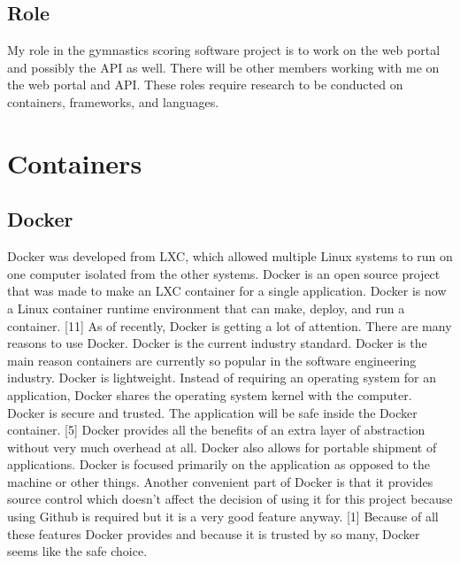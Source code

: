\documentclass[letterpaper,10pt,draftclsnofoot,onecolumn,]{article}
\begin{document}
\subsection{Role}
My role in the gymnastics scoring software project is to work on the web portal and possibly the API as well. There will be other members working with me on the web portal and API. These roles require research to be conducted on containers, frameworks, and languages.

\section{Containers}

\subsection{Docker}
Docker was developed from LXC, which allowed multiple Linux systems to run on one computer isolated from the other systems. Docker is an open source project that was made to make an LXC container for a single application. Docker is now a Linux container runtime environment that can make, deploy, and run a container. [11] As of recently, Docker is getting a lot of attention. There are many reasons to use Docker. Docker is the current industry standard. Docker is the main reason containers are currently so popular in the software engineering industry. Docker is lightweight. Instead of requiring an operating system for an application, Docker shares the operating system kernel with the computer. Docker is secure and trusted. The application will be safe inside the Docker container. [5] Docker provides all the benefits of an extra layer of abstraction without very much overhead at all. Docker also allows for portable shipment of applications. Docker is focused primarily on the application as opposed to the machine or other things. Another convenient part of Docker is that it provides source control which doesn't affect the decision of using it for this project because using Github is required but it is a very good feature anyway. [1] Because of all these features Docker provides and because it is trusted by so many, Docker seems like the safe choice.
\end{document}
